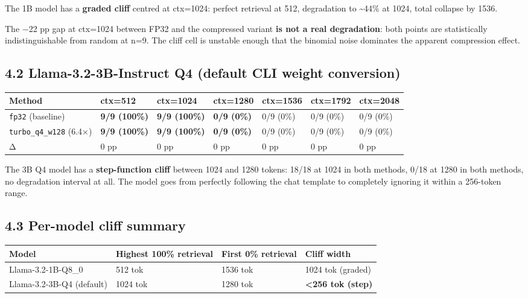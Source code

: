 \documentclass[11pt]{article}
\begin{document}
The 1B model has a \textbf{graded cliff} centred at ctx=1024: perfect retrieval at 512, degradation to \textasciitilde{}44\% at 1024, total collapse by 1536.


The −22 pp gap at ctx=1024 between FP32 and the compressed variant \textbf{is not a real degradation}: both points are statistically indistinguishable from random at n=9. The cliff cell is unstable enough that the binomial noise dominates the apparent compression effect.


\subsection*{4.2 Llama-3.2-3B-Instruct Q4 (default CLI weight conversion)}


\begin{center}
\begin{tabular}{lllllll}
\toprule
Method & ctx=512 & ctx=1024 & ctx=1280 & ctx=1536 & ctx=1792 & ctx=2048 \\
\midrule
\texttt{fp32} (baseline) & \textbf{9/9 (100\%)} & \textbf{9/9 (100\%)} & \textbf{0/9 (0\%)} & 0/9 (0\%) & 0/9 (0\%) & 0/9 (0\%) \\
\texttt{turbo\_q4\_w128} (6.4×) & \textbf{9/9 (100\%)} & \textbf{9/9 (100\%)} & \textbf{0/9 (0\%)} & 0/9 (0\%) & 0/9 (0\%) & 0/9 (0\%) \\
Δ & 0 pp & 0 pp & 0 pp & 0 pp & 0 pp & 0 pp \\
\bottomrule
\end{tabular}
\end{center}


The 3B Q4 model has a \textbf{step-function cliff} between 1024 and 1280 tokens: 18/18 at 1024 in both methods, 0/18 at 1280 in both methods, no degradation interval at all. The model goes from perfectly following the chat template to completely ignoring it within a 256-token range.


\subsection*{4.3 Per-model cliff summary}


\begin{center}
\begin{tabular}{llll}
\toprule
Model & Highest 100\% retrieval & First 0\% retrieval & Cliff width \\
\midrule
Llama-3.2-1B-Q8\_0 & 512 tok & 1536 tok & 1024 tok (graded) \\
Llama-3.2-3B-Q4 (default) & 1024 tok & 1280 tok & \textbf{<256 tok (step)} \\
\bottomrule
\end{tabular}
\end{center}
\end{document}
